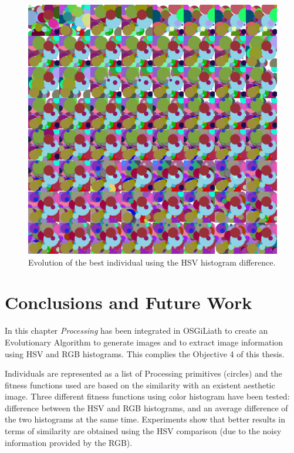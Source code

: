 \begin{figure}
   \includegraphics[scale =0.10] {gfx/art/collage.png}
\caption{Evolution of the best individual using the HSV histogram difference. }
\label{fig:collage}
\end{figure}

\section{Conclusions and Future Work}
\label{sec:conclusions}
In this chapter {\em Processing} has been integrated in OSGiLiath
to create an Evolutionary Algorithm  to generate images and to extract
image information using HSV and RGB histograms. This complies the Objective 4 of this thesis.

Individuals are represented as a list of Processing primitives
(circles) and the fitness functions used are based on the similarity
with an existent aesthetic image. %
 Three different fitness functions
using color histogram have been tested: difference between the HSV and
RGB histograms, and an average difference of the two histograms at the
same time. Experiments show that better results in terms of similarity
are obtained using the HSV comparison (due to the noisy information
provided by the RGB).  %

